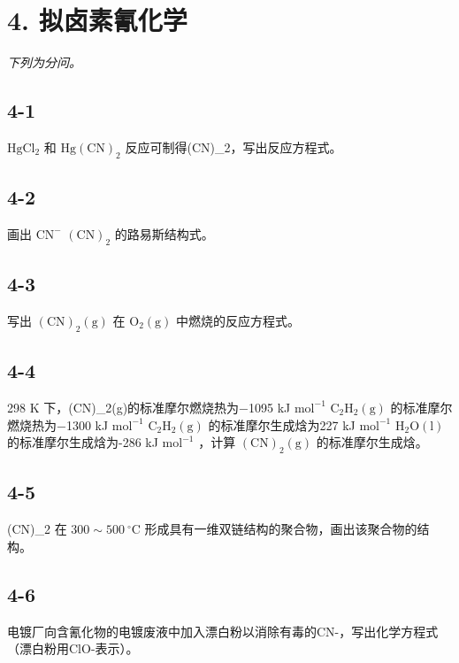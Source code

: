 \section*{4. 拟卤素氰化学}
\textit{下列为分问。}

\subsection*{4-1}
$\mathrm { H g C l _ { 2 } }$ 和 $\mathrm { H g ( C N ) _ { 2 } }$ 反应可制得(CN)_{2}，写出反应⽅程式。

\subsection*{4-2}
画出 $\mathrm { C N ^ { - } }$ $( \mathrm { C N } ) _ { 2 }$ 的路易斯结构式。

\subsection*{4-3}
写出 $\mathrm { ( C N ) _ { 2 } ( g ) }$ 在 $\mathrm { O _ { 2 } ( g ) }$ 中燃烧的反应⽅程式。

\subsection*{4-4}
298 K 下，(CN)_{2}(g)的标准摩尔燃烧热为−1095 kJ $\mathrm { m o l ^ { - 1 } }$ $\mathrm { C _ { 2 } H _ { 2 } ( g ) }$ 的标准摩尔燃烧热为−1300 kJ $\mathrm { m o l ^ { - 1 } }$ $\mathrm { C _ { 2 } H _ { 2 } ( g ) }$ 的标准摩尔⽣成焓为227 kJ $\mathrm { m o l ^ { - 1 } }$ $\mathrm { H _ { 2 } O ( l ) }$ 的标准摩尔⽣成焓为-286 kJ $\mathrm { m o l ^ { - 1 } }$ ，计算 $\mathrm { ( C N ) _ { 2 } ( g ) }$ 的标准摩尔⽣成焓。

\subsection*{4-5}
(CN)_{2} 在 $3 0 0 { \sim } 5 0 0 \ ^ { \circ } \mathrm { C }$ 形成具有⼀维双链结构的聚合物，画出该聚合物的结构。

\subsection*{4-6}
电镀⼚向含氰化物的电镀废液中加⼊漂⽩粉以消除有毒的CN-，写出化学⽅程式（漂⽩粉⽤ClO-表⽰）。
